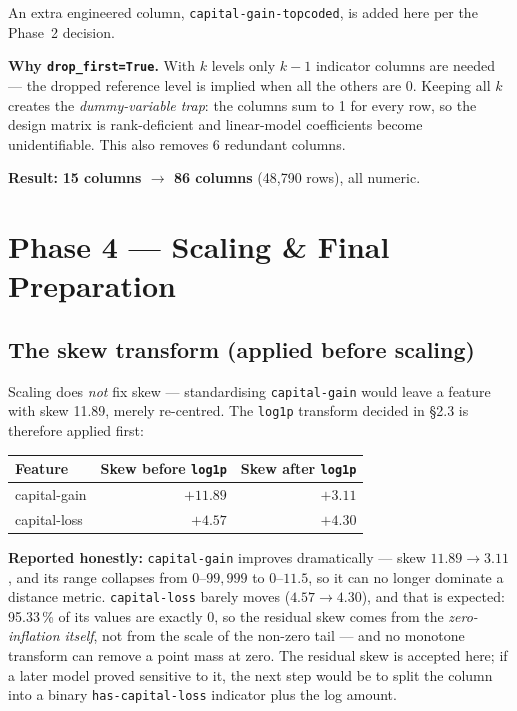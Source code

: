 \documentclass[11pt,a4paper]{article}
\newcommand{\code}[1]{\texttt{\small #1}}
\begin{document}
\noindent
An extra engineered column, \code{capital-gain-topcoded}, is added here per the Phase~2
decision.

\medskip
\noindent
\textbf{Why \code{drop\_first=True}.} With $k$ levels only $k-1$ indicator columns are
needed --- the dropped reference level is implied when all the others are 0. Keeping all
$k$ creates the \emph{dummy-variable trap}: the columns sum to 1 for every row, so the
design matrix is rank-deficient and linear-model coefficients become unidentifiable. This
also removes 6 redundant columns.

\medskip
\noindent
\textbf{Result:} \textbf{15 columns $\to$ 86 columns} (48{,}790 rows), all numeric.

\section{Phase 4 --- Scaling \& Final Preparation}

\subsection{The skew transform (applied before scaling)}

Scaling does \emph{not} fix skew --- standardising \code{capital-gain} would leave a
feature with skew 11.89, merely re-centred. The \code{log1p} transform decided in \S2.3 is
therefore applied first:

\begin{table}[H]
\centering
\small
\begin{tabular}{lrr}
\toprule
\textbf{Feature} & \textbf{Skew before \code{log1p}} & \textbf{Skew after \code{log1p}} \\
\midrule
capital-gain & $+11.89$ & $\mathbf{+3.11}$ \\
capital-loss & $+4.57$  & $+4.30$ \\
\bottomrule
\end{tabular}
\end{table}

\noindent
\textbf{Reported honestly:} \code{capital-gain} improves dramatically --- skew
$11.89 \to 3.11$, and its range collapses from $0$--$99{,}999$ to $0$--$11.5$, so it can no
longer dominate a distance metric. \code{capital-loss} barely moves ($4.57 \to 4.30$), and
that is expected: 95.33\,\% of its values are exactly 0, so the residual skew comes from
the \emph{zero-inflation itself}, not from the scale of the non-zero tail --- and no
monotone transform can remove a point mass at zero. The residual skew is accepted here;
if a later model proved sensitive to it, the next step would be to split the column into a
binary \code{has-capital-loss} indicator plus the log amount.
\end{document}

